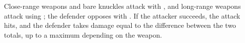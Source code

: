 
Close-range weapons and bare knuckles attack with , and long-range weapons attack using ; the defender opposes with . If the attacker succeeds, the attack hits, and the defender takes damage equal to the difference between the two totals, up to a maximum depending on the weapon.
